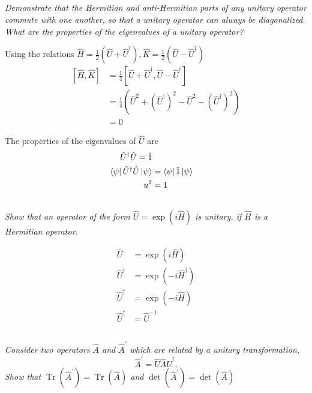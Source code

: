 \documentclass{article}
\begin{document}
\subsection{}
\textit{Demonstrate that the Hermitian and anti-Hermitian parts of any unitary operator commute with one another, so that a unitary operator can always be diagonalized. What are the properties of the eigenvalues of a unitary operator?}

Using the relations $\hat H = \frac{1}{2} (\hat{U} + \hat{U}^\dagger),\hat K = \frac{1}{2} (\hat{U}  - \hat{ U}^\dagger)$
\begin{align*}
    \left[\hat H, \hat K \right] &= \frac{1}{4}\left[\hat{U} + \hat{U}^\dagger, \hat{U} - \hat{U}^\dagger\right]\\
    & = \frac{1}{4}\left(\hat{U}^2 + (\hat{U}^\dagger)^2 -  \hat{U}^2 - (\hat{U}^\dagger)^2 \right)\\
    &=0
\end{align*}

The properties of the eigenvalues of $\hat U$ are
\begin{align*}
    \hat{U}^\dagger \hat{U} = \hat 1\\
    \bra{\psi}\hat{U}^\dagger \hat{U}\ket{\psi} &= \bra{\psi}\hat 1 \ket{\psi}\\
    u^2 &=1
\end{align*}

\subsection{}
\textit{Show that an operator of the form $\hat{U}=\exp (i \hat{H})$ is unitary, if $\hat{H}$ is a Hermitian operator.}


\begin{align*}
    \hat{U} &=\exp (i \hat{H}) \\
    \hat{U}^\dagger &=\exp (-i \hat{H}^\dagger) \\
    \hat{U}^\dagger &=\exp (-i \hat{H}) \\
    \hat{U}^\dagger &=\hat{U}^{-1}
\end{align*}

\subsection{}
\textit{Consider two operators $\hat{A}$ and $\hat{A}^{\prime}$ which are related by a unitary transformation,} 
$$
\hat{A}^{\prime}=\hat{U} \hat{A} \hat{U}^{\dagger}.
$$
\textit{Show that $\operatorname{Tr}\left(\hat{A}^{\prime}\right)=\operatorname{Tr}(\hat{A})$ and $\operatorname{det}\left(\hat{A}^{\prime}\right)=\operatorname{det}(\hat{A})$}
\end{document}
